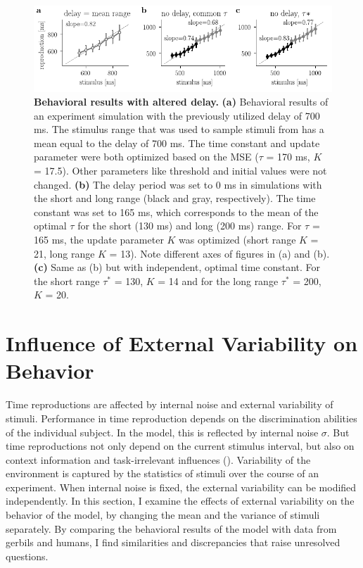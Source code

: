 \documentclass[10pt]{article}
\begin{document}
\begin{figure}[ht]
	\centering
	\includegraphics{figures/delay.pdf}
	\caption{\textbf{Behavioral results with altered delay.} 
	\textbf{(a)} Behavioral results of an experiment simulation with the previously utilized delay of 700 ms. The stimulus range that was used to sample stimuli from has a mean equal to the delay of 700 ms. The time constant and update parameter were both optimized based on the MSE ($\tau$ = 170 ms, $K$ = 17.5). Other parameters like threshold and initial values were not changed. 
	\textbf{(b)} The delay period was set to 0 ms in simulations with the short and long range (black and gray, respectively). The time constant was set to 165 ms, which corresponds to the mean of the optimal $\tau$ for the short (130 ms) and long (200 ms) range. For $\tau$ = 165 ms, the update parameter $K$ was optimized (short range $K$ = 21, long range $K$ = 13). Note different axes of figures in (a) and (b).
	\textbf{(c)} Same as (b) but with independent, optimal time constant. For the short range $\tau^*$ = 130, $K$ = 14 and for the long range $\tau^*$ = 200, $K$ = 20.
	}
\label{fig:delay}
\end{figure}

\section{Influence of External Variability on Behavior} \label{externalvar}
Time reproductions are affected by internal noise and external variability of stimuli.
Performance in time reproduction depends on the discrimination abilities of the individual subject. In the model, this is reflected by internal noise $\sigma$.
But time reproductions not only depend on the current stimulus interval, but also on context information and task-irrelevant influences (\cite{Bausenhart2016}).
Variability of the environment is captured by the statistics of stimuli over the course of an experiment. 
When internal noise is fixed, the external variability can be modified independently. 
In this section, I examine the effects of external variability on the behavior of the model, by changing the mean and the variance of stimuli separately. 
By comparing the behavioral results of the model with data from gerbils and humans, I find similarities and discrepancies that raise unresolved questions.
\end{document}
